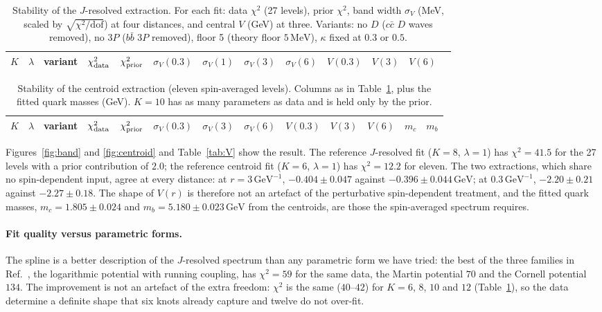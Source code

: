 \documentclass[10pt,twocolumn]{article}
\newcommand{\cc}{c\bar c}
\newcommand{\bb}{b\bar b}
\newcommand{\MeV}{\,\mathrm{MeV}}
\newcommand{\GeV}{\,\mathrm{GeV}}
\newcommand{\GeVi}{\,\mathrm{GeV}^{-1}}
\begin{document}
\begin{table}[t]
\caption{Stability of the $J$-resolved extraction. For each fit: data $\chi^2$ (27 levels), prior $\chi^2$, band width $\sigma_V$ (MeV, scaled by $\sqrt{\chi^2/\mathrm{dof}}$) at four distances, and central $V$ (GeV) at three. Variants: no $D$ ($\cc$ $D$ waves removed), no $3P$ ($\bb$ $3P$ removed), floor 5 (theory floor $5\MeV$), $\kappa$ fixed at $0.3$ or $0.5$.}
\label{tab:stab}
\centering\small
\begin{tabular}{cclcccccccccc}
\toprule
$K$ & $\lambda$ & variant & $\chi^2_{\rm data}$ & $\chi^2_{\rm prior}$ & $\sigma_V(0.3)$ & $\sigma_V(1)$ & $\sigma_V(3)$ & $\sigma_V(6)$ & $V(0.3)$ & $V(3)$ & $V(6)$ \\
\midrule

\end{tabular}
\end{table}

\begin{table}[t]
\caption{Stability of the centroid extraction (eleven spin-averaged levels). Columns as in Table~\ref{tab:stab}, plus the fitted quark masses (GeV). $K=10$ has as many parameters as data and is held only by the prior.}
\label{tab:cstab}
\centering\small
\begin{tabular}{cclcccccccccc}
\toprule
$K$ & $\lambda$ & variant & $\chi^2_{\rm data}$ & $\chi^2_{\rm prior}$ & $\sigma_V(0.3)$ & $\sigma_V(3)$ & $\sigma_V(6)$ & $V(0.3)$ & $V(3)$ & $V(6)$ & $m_c$ & $m_b$ \\
\midrule

\end{tabular}
\end{table}

Figures~\ref{fig:band} and \ref{fig:centroid} and Table~\ref{tab:V} show the result.
The reference $J$-resolved fit ($K=8$, $\lambda=1$) has $\chi^2=41.5$ for the 27 levels with a prior contribution of $2.0$; the reference centroid fit ($K=6$, $\lambda=1$) has $\chi^2=12.2$ for eleven.
The two extractions, which share no spin-dependent input, agree at every distance: at $r=3\GeVi$, $-0.404\pm0.047$ against $-0.396\pm0.044\GeV$; at $0.3\GeVi$, $-2.20\pm0.21$ against $-2.27\pm0.18$.
The shape of $V(r)$ is therefore not an artefact of the perturbative spin-dependent treatment, and the fitted quark masses, $m_c=1.805\pm0.024$ and $m_b=5.180\pm0.023\GeV$ from the centroids, are those the spin-averaged spectrum requires.

\paragraph{Fit quality versus parametric forms.}
The spline is a better description of the $J$-resolved spectrum than any parametric form we have tried: the best of the three families in Ref.~\cite{Oppong2026}, the logarithmic potential with running coupling, has $\chi^2=59$ for the same data, the Martin potential $70$ and the Cornell potential $134$.
The improvement is not an artefact of the extra freedom: $\chi^2$ is the same ($40$--$42$) for $K=6$, $8$, $10$ and $12$ (Table~\ref{tab:stab}), so the data determine a definite shape that six knots already capture and twelve do not over-fit.
\end{document}
